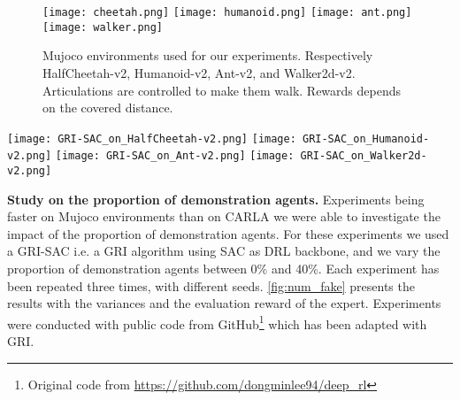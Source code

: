 \documentclass[letterpaper, 10 pt, conference]{ieeeconf}
\begin{document}
\begin{figure}[!h]
    \centering
    \texttt{[image: cheetah.png]}  
    \texttt{[image: humanoid.png]}      \texttt{[image: ant.png]}
    \texttt{[image: walker.png]}
    \caption{Mujoco environments used for our experiments. Respectively HalfCheetah-v2, Humanoid-v2, Ant-v2, and Walker2d-v2. Articulations are controlled to make them walk. Rewards depends on the covered distance.}
    \label{fig:mujoco}
\end{figure}



\begin{figure*}[h!]
    \centering
    \texttt{[image: GRI-SAC\_on\_HalfCheetah-v2.png]}
    \texttt{[image: GRI-SAC\_on\_Humanoid-v2.png]}
    \texttt{[image: GRI-SAC\_on\_Ant-v2.png]}
    \texttt{[image: GRI-SAC\_on\_Walker2d-v2.png]}
    \caption{Evolution of the evaluation reward on Mujoco environments with different proportions of demonstration agents with GRI-SAC. GRI-SAC with 0\% demonstration agent is vanilla SAC. We observe that GRI-SAC always reaches the level of the expert even when the expert is significantly better than the trained vanilla SAC. The proportion of demonstration agent have a significant impact on the dynamic of the convergence.}
    \label{fig:num_fake}
\end{figure*}

\textbf{Study on the proportion of demonstration agents.} Experiments being faster on Mujoco environments than on CARLA we were able to investigate the impact of the proportion of demonstration agents.
For these experiments we used a GRI-SAC i.e. a GRI algorithm using SAC \cite{sac} as DRL backbone, and we vary the proportion of demonstration agents between 0\% and 40\%. Each experiment has been repeated three times, with different seeds. \cref{fig:num_fake} presents the results with the variances and the evaluation reward of the expert. Experiments were conducted with public code from GitHub\footnote{Original code from \url{https://github.com/dongminlee94/deep_rl}} which has been adapted with GRI.
\end{document}
